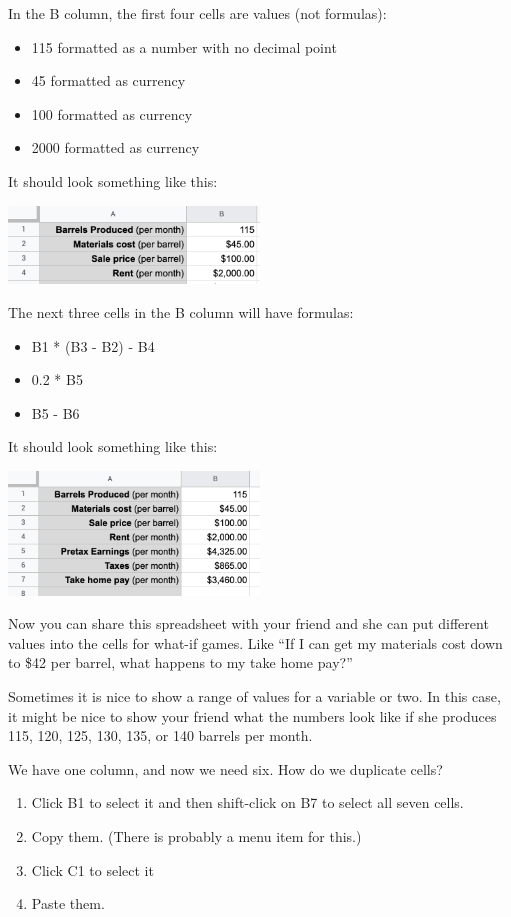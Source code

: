 In the B column, the first four cells are values (not formulas):
\begin{itemize}
\item{115 formatted as a number with no decimal point}
\item{45 formatted as currency}
\item{100 formatted as currency}
\item{2000 formatted as currency}
\end{itemize}

It should look something like this:

\includegraphics[width=0.5\textwidth]{BarrelValues.png}

The next three cells in the B column will have formulas:
\begin{itemize}
\item{B1 * (B3 - B2) - B4}
\item{0.2 * B5}
\item{B5 - B6}
\end{itemize}

It should look something like this:

\includegraphics[width=0.5\textwidth]{BarrelFormulas.png}

Now you can share this spreadsheet with your friend and she can put
different values into the cells for what-if games.  Like ``If I can
get my materials cost down to \$42 per barrel, what happens to my take
home pay?''

Sometimes it is nice to show a range of values for a variable or two.
In this case, it might be nice to show your friend what the numbers
look like if she produces 115, 120, 125, 130, 135, or 140 barrels per
month.

We have one column, and now we need six. How do we duplicate cells?
\begin{enumerate}
\item Click B1 to select it and then shift-click on B7 to select all seven cells.
\item Copy them. (There is probably a menu item for this.)
\item Click C1 to select it
\item Paste them.
\end{enumerate}

